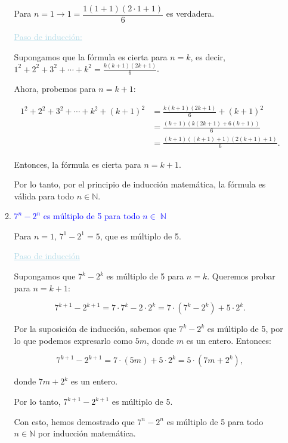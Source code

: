 \documentclass[12pt]{article}
\newcommand{\bu}[1]{\textcolor{lightblue}{\underline{#1}}}
\newcommand{\db}[1]{\textcolor{blue}{#1}}
\DeclareMathOperator{\N}{\mathbb{N}}
\begin{document}
\begin{enumerate}[label=\color{red}\textbf{\arabic*)},leftmargin=*]
\begin{enumerate}[label=\color{red}\alph*)]
      	Para $n=1\longrightarrow 1=\dfrac{1(1+1)(2\cdot 1+1)}{6}$ es verdadera.
      	
      	\bu{Paso de inducción:}
      	
      	Supongamos que la fórmula es cierta para \(n = k\), es decir, \(1^2+2^2+3^2+\cdots+k^2 = \frac{k(k+1)(2k+1)}{6}\).
      	
      	Ahora, probemos para \(n = k + 1\):

      	\begin{align*}
      		1^2+2^2+3^2+\cdots+k^2+(k+1)^2 &= \frac{k(k+1)(2k+1)}{6} + (k+1)^2 \\
      		&= \frac{(k+1)(k(2k+1) + 6(k+1))}{6} \\
      		&= \frac{(k+1)((k+1)+1)(2(k+1)+1)}{6}.
      	\end{align*}

      	Entonces, la fórmula es cierta para \(n = k + 1\).
      	
      	Por lo tanto, por el principio de inducción matemática, la fórmula es válida para todo \(n \in \mathbb{N}\).
      	\item \db{$7^n-2^n$ es múltiplo de 5 para todo $n\in\N$} 
      	
      	Para \(n = 1\), \(7^1 - 2^1 = 5\), que es múltiplo de 5.
      	
      	\bu{Paso de inducción}
      	
      	Supongamos que \(7^k - 2^k\) es múltiplo de 5 para \(n = k\). Queremos probar para \(n = k + 1\):
      	
      	
      	\[7^{k+1} - 2^{k+1} = 7 \cdot 7^k - 2 \cdot 2^k = 7 \cdot (7^k - 2^k) + 5 \cdot 2^k.\]
      	
      	Por la suposición de inducción, sabemos que \(7^k - 2^k\) es múltiplo de 5, por lo que podemos expresarlo como \(5m\), donde \(m\) es un entero. Entonces:
      	
      	\[7^{k+1} - 2^{k+1} = 7 \cdot (5m) + 5 \cdot 2^k = 5 \cdot (7m + 2^k),\]
      	
      	donde \(7m + 2^k\) es un entero.
      	
      	Por lo tanto, \(7^{k+1} - 2^{k+1}\) es múltiplo de 5.
      	
      	Con esto, hemos demostrado que \(7^n - 2^n\) es múltiplo de 5 para todo \(n \in \mathbb{N}\) por inducción matemática.
      	

\end{enumerate}
\end{enumerate}
\end{document}
